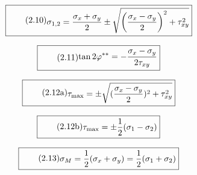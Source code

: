 \documentclass[11pt]{article}
\newcommand{\1}{ {\mathds{1}} }
\begin{document}
    \begin{equation}
      \boxed{
        \tag{2.10}
        \begin{split}
          \sigma_{1,2}
          =
          \frac{\sigma_x + \sigma_y}{2}
          \pm
          \sqrt{\left(
            \frac{\sigma_x - \sigma_y}{2}
            \right)^2
            +
            \tau_{xy}^2
          }
        \end{split}
      }
    \end{equation}

    \begin{equation}
      \boxed{
        \tag{2.11}
        \begin{split}
          \tan 2\varphi^{\ast\ast}
          =
          -\frac{\sigma_x - \sigma_y}{2 \tau_{xy}}
        \end{split}
      }
    \end{equation}

    \begin{equation}
      \boxed{
        \tag{2.12a}
        \begin{split}
          \tau_{\text{max}}
          =
          \pm
          \sqrt{(\frac{\sigma_x - \sigma_y}{2})^2 + \tau_{xy}^2}
        \end{split}
      }
    \end{equation}

    \begin{equation}
      \boxed{
        \tag{2.12b}
        \begin{split}
          \tau_{\text{max}}
          =
          \pm
          \frac{1}{2}(\sigma_1 -\sigma_2)
        \end{split}
      }
    \end{equation}

    \begin{equation}
      \boxed{
        \tag{2.13}
        \begin{split}
          \sigma_M
          =
          \frac{1}{2}(\sigma_x + \sigma_y)
          =
          \frac{1}{2}(\sigma_1 + \sigma_2)
        \end{split}
      }
    \end{equation}
\end{document}
